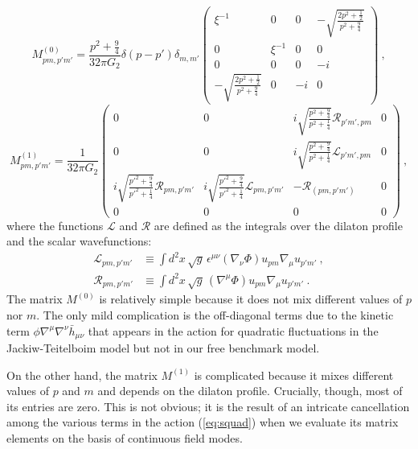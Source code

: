 \documentclass[12pt]{article}
\begin{document}
\begin{equation}
	M^{(0)}_{p m,p'm'} = \frac{p^2 + \frac{9}{4}}{32\pi G_2} \delta(p-p')\delta_{m,m'}
	\begin{pmatrix} 
		\xi^{-1} & 0 & 0 & - \sqrt{\frac{2 p^2 + \frac{1}{2}}{p^2 + \frac{9}{4}}} \\
		0 & \xi^{-1} & 0 & 0 \\
		0 & 0 & 0 & -i \\
		- \sqrt{\frac{2 p^2 + \frac{1}{2}}{p^2 + \frac{9}{4}}} & 0 & -i & 0
	\end{pmatrix}~,
\label{eq:m0}
\end{equation}
\begin{equation}
	M^{(1)}_{p m, p' m'} = \frac{1}{32\pi G_2}\begin{pmatrix}
	0 & 0 & i \sqrt{\frac{p^2 + \frac{9}{4}}{p^2 + \frac{1}{4}}} \mathcal{R}_{p' m', p m} & 0 \\
	0 & 0 & i \sqrt{\frac{p^2 + \frac{9}{4}}{p^2 + \frac{1}{4}}} \mathcal{L}_{p' m', p m} & 0 \\
	i \sqrt{\frac{{p'}^2 + \frac{9}{4}}{{p'}^2 + \frac{1}{4}}}\mathcal{R}_{p m, p' m'} & i \sqrt{\frac{{p'}^2 + \frac{9}{4}}{{p'}^2 + \frac{1}{4}}}\mathcal{L}_{p m, p' m'} & -\mathcal{R}_{(p m, p' m')} & 0 \\
	0 & 0 & 0 & 0
	\end{pmatrix}~,
\label{eq:m1}
\end{equation}
where the functions $\mathcal{L}$ and $\mathcal{R}$ are defined as the integrals over the dilaton profile and the scalar wavefunctions:
\begin{equation}\begin{aligned}
	\mathcal{L}_{p m,p' m'} &\equiv \int d^2x\,\sqrt{g}\,\epsilon^{\mu\nu}\left(\nabla_\nu \Phi\right) u_{pm} \nabla_\mu u_{p'm'}~, \\
	\mathcal{R}_{p m,p' m'} &\equiv \int d^2x\,\sqrt{g}\,\left(\nabla^\mu \Phi\right) u_{pm} \nabla_\mu u_{p'm'}~.
\label{eq:mlr}
\end{aligned}\end{equation}
The matrix $M^{(0)}$ is relatively simple because it does not mix different values of $p$ nor $m$. The only mild complication is the off-diagonal terms due to 
the kinetic term $\phi \nabla^\mu \nabla^\nu \bar{h}_{\mu\nu}$ that appears in the action for quadratic fluctuations in the Jackiw-Teitelboim model but not in our free benchmark model. 

On the other hand, the matrix $M^{(1)}$ is complicated because it mixes different values of $p$ and $m$ and depends on the dilaton profile.  Crucially, though, most of its entries are zero.  This is not obvious; it is the result of an intricate cancellation among the various terms in the action (\ref{eq:squad}) when we evaluate its matrix elements
on the basis of continuous field modes.
\end{document}
